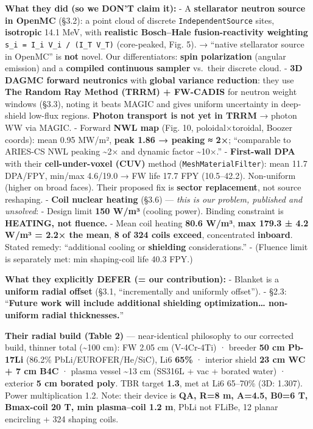 \documentclass[
]{article}
\begin{document}
\textbf{What they did (so we DON'T claim it):} - A \textbf{stellarator
neutron source in OpenMC} (§3.2): a point cloud of discrete
\texttt{IndependentSource} sites, \textbf{isotropic} 14.1 MeV, with
\textbf{realistic Bosch--Hale fusion-reactivity weighting}
\texttt{s\_i\ =\ I\_i\ V\_i\ /\ (I\_T\ V\_T)} (core-peaked, Fig. 5). →
``native stellarator source in OpenMC'' is \textbf{not} novel. Our
differentiators: \textbf{spin polarization} (angular emission) and a
\textbf{compiled continuous sampler} vs.~their discrete cloud. -
\textbf{3D DAGMC forward neutronics} with \textbf{global variance
reduction}: they use \textbf{The Random Ray Method (TRRM) + FW-CADIS}
for neutron weight windows (§3.3), noting it beats MAGIC and gives
uniform uncertainty in deep-shield low-flux regions. \textbf{Photon
transport is not yet in TRRM} → photon WW via MAGIC. - Forward
\textbf{NWL map} (Fig. 10, poloidal×toroidal, Boozer coords): mean 0.95
MW/m², \textbf{peak 1.86 → peaking ≈ 2×}; ``comparable to ARIES-CS NWL
peaking \textasciitilde2× and dynamic factor \textasciitilde10×.'' -
\textbf{First-wall DPA} with their \textbf{cell-under-voxel (CUV)}
method (\texttt{MeshMaterialFilter}): mean 11.7 DPA/FPY, min/max
4.6/19.0 → FW life 17.7 FPY (10.5--42.2). Non-uniform (higher on broad
faces). Their proposed fix is \textbf{sector replacement}, not source
reshaping. - \textbf{Coil nuclear heating} (§3.6) --- \emph{this is our
problem, published and unsolved}: - Design limit \textbf{150 W/m³}
(cooling power). Binding constraint is \textbf{HEATING, not fluence.} -
Mean coil heating \textbf{80.6 W/m³}, \textbf{max 179.3 ± 4.2 W/m³ =
2.2× the mean}, \textbf{8 of 324 coils exceed}, concentrated
\textbf{inboard}. Stated remedy: ``additional cooling or
\textbf{shielding} considerations.'' - (Fluence limit is separately met:
min shaping-coil life 40.3 FPY.)

\textbf{What they explicitly DEFER (= our contribution):} - Blanket is a
\textbf{uniform radial offset} (§3.1, ``incrementally and uniformly
offset''). - §2.3: ``\textbf{Future work will include additional
shielding optimization\ldots{} non-uniform radial thicknesses.}''

\textbf{Their radial build (Table 2)} --- near-identical philosophy to
our corrected build, thinner total (\textasciitilde100 cm): FW 2.05 cm
(V-4Cr-4Ti) · breeder \textbf{50 cm Pb-17Li} (86.2\%
PbLi/EUROFER/He/SiC), Li6 \textbf{65\%} · interior shield \textbf{23 cm
WC + 7 cm B4C} · plasma vessel \textasciitilde13 cm (SS316L + vac +
borated water) · exterior \textbf{5 cm borated poly}. TBR target
\textbf{1.3}, met at Li6 65--70\% (3D: 1.307). Power multiplication 1.2.
Note: their device is \textbf{QA, R=8 m, A=4.5, B0=6 T, Bmax-coil 20 T,
min plasma--coil 1.2 m}, PbLi not FLiBe, 12 planar encircling + 324
shaping coils.
\end{document}
